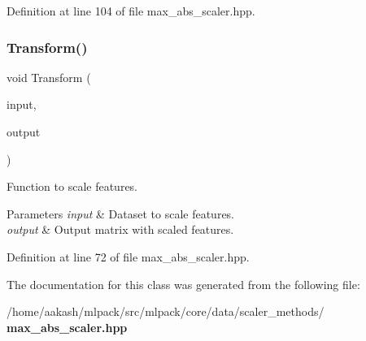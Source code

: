 Definition at line 104 of file max\+\_\+abs\+\_\+scaler.\+hpp.

\mbox{\label{classmlpack_1_1data_1_1MaxAbsScaler_a7bc470a1e097f5b0aaf2396691432b3f}} 
\subsubsection{Transform()}
{\footnotesize\ttfamily void Transform (\begin{DoxyParamCaption}\item[{const Mat\+Type \&}]{input,  }\item[{Mat\+Type \&}]{output }\end{DoxyParamCaption})\hspace{0.3cm}{\ttfamily [inline]}}



Function to scale features. 


\begin{DoxyParams}{Parameters}
{\em input} & Dataset to scale features. \\
\hline
{\em output} & Output matrix with scaled features. \\
\hline
\end{DoxyParams}


Definition at line 72 of file max\+\_\+abs\+\_\+scaler.\+hpp.



The documentation for this class was generated from the following file\+:\begin{DoxyCompactItemize}
\item 
/home/aakash/mlpack/src/mlpack/core/data/scaler\+\_\+methods/\textbf{ max\+\_\+abs\+\_\+scaler.\+hpp}\end{DoxyCompactItemize}
